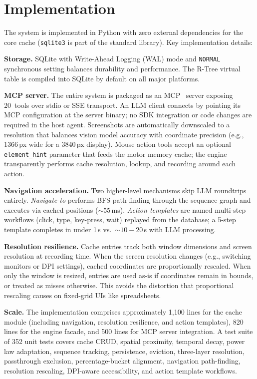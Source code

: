 \documentclass[conference]{IEEEtran}
\begin{document}
\section{Implementation}

The system is implemented in Python with zero external dependencies for the core cache (\texttt{sqlite3} is part of the standard library). Key implementation details:

\textbf{Storage.} SQLite with Write-Ahead Logging (WAL) mode and \texttt{NORMAL} synchronous setting balances durability and performance. The R-Tree virtual table is compiled into SQLite by default on all major platforms.

\textbf{MCP server.} The entire system is packaged as an MCP~\cite{mcp2024} server exposing 20~tools over stdio or SSE transport. An LLM client connects by pointing its MCP configuration at the server binary; no SDK integration or code changes are required in the host agent. Screenshots are automatically downscaled to a resolution that balances vision model accuracy with coordinate precision (e.g., 1366\,px wide for a 3840\,px display). Mouse action tools accept an optional \texttt{element\_hint} parameter that feeds the motor memory cache; the engine transparently performs cache resolution, lookup, and recording around each action.

\textbf{Navigation acceleration.} Two higher-level mechanisms skip LLM roundtrips entirely. \emph{Navigate-to} performs BFS path-finding through the sequence graph and executes via cached positions (${\sim}55$\,ms). \emph{Action templates} are named multi-step workflows (click, type, key-press, wait) replayed from the database; a 5-step template completes in under 1\,s vs.\ ${\sim}10{-}20$\,s with LLM processing.

\textbf{Resolution resilience.} Cache entries track both window dimensions and screen resolution at recording time. When the screen resolution changes (e.g., switching monitors or DPI settings), cached coordinates are proportionally rescaled. When only the window is resized, entries are used as-is if coordinates remain in bounds, or treated as misses otherwise. This avoids the distortion that proportional rescaling causes on fixed-grid UIs like spreadsheets.

\textbf{Scale.} The implementation comprises approximately 1{,}100 lines for the cache module (including navigation, resolution resilience, and action templates), 820 lines for the engine facade, and 500 lines for MCP server integration. A test suite of 352 unit tests covers cache CRUD, spatial proximity, temporal decay, power law adaptation, sequence tracking, persistence, eviction, three-layer resolution, passthrough exclusion, percentage-bucket alignment, navigation path-finding, resolution rescaling, DPI-aware accessibility, and action template workflows.
\end{document}
